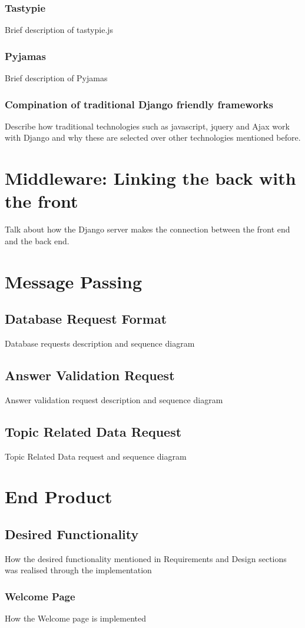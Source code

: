 \documentclass{l3proj}
\begin{document}
\subsubsection{Tastypie}
Brief description of tastypie.js
\subsubsection{Pyjamas}
Brief description of Pyjamas
\subsubsection{Compination of traditional Django friendly frameworks}
Describe how traditional technologies such as javascript, jquery and Ajax work with Django and why these are selected over other technologies mentioned before.
\section{Middleware: Linking the back with the front}
Talk about how the Django server makes the connection between the front end and the back end.
\section{Message Passing}
\subsection{Database Request Format}
Database requests description and sequence diagram
\subsection{Answer Validation Request}
Answer validation request description and sequence diagram
\subsection{Topic Related Data Request}
Topic Related Data request and sequence diagram
\section{End Product}
\subsection{Desired Functionality}
How the desired functionality mentioned in Requirements and Design sections was realised through the implementation
\subsubsection{Welcome Page}
How the Welcome page is implemented
\end{document}

